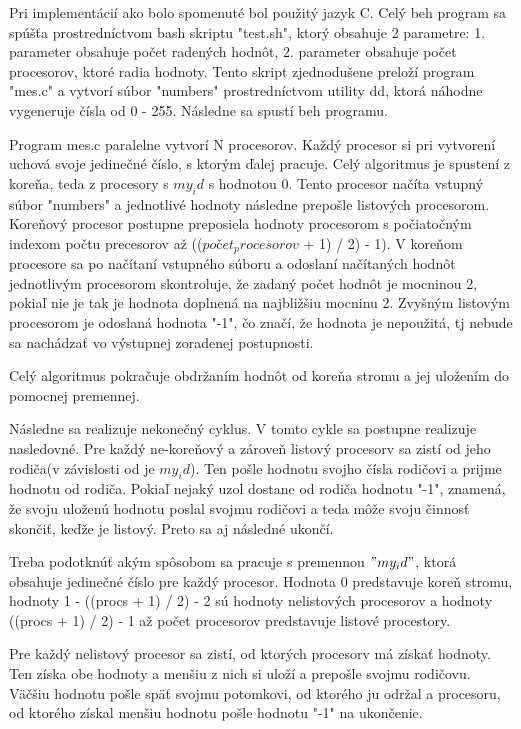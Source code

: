 \documentclass[12pt,a4paper,titlepage,final]{article}
\begin{document}
Pri implementácií ako bolo spomenuté bol použitý jazyk C. Celý beh program sa spúšťa prostredníctvom bash skriptu "test.sh", ktorý obsahuje 2 parametre: 1. parameter obsahuje počet radených hodnôt, 2. parameter obsahuje počet procesorov, ktoré radia hodnoty. Tento skript zjednodušene preloží program "mes.c" a vytvorí súbor "numbers" prostredníctvom utility dd, ktorá náhodne vygeneruje čísla od 0 - 255. Následne sa spustí beh programu.

Program mes.c paralelne vytvorí N procesorov. Každý procesor si pri vytvorení uchová svoje jedinečné číslo, s ktorým ďalej pracuje. Celý algoritmus je spustení z koreňa, teda z procesory s $my_id$ s hodnotou 0. Tento procesor načíta vstupný súbor "numbers" a jednotlivé hodnoty následne prepošle listových procesorom. Koreňový procesor postupne preposiela hodnoty procesorom s počiatočným indexom počtu precesorov až (($počet_procesorov$ + 1) / 2) - 1). V koreňom procesore sa po načítaní vstupného súboru a odoslaní načítaných hodnôt jednotlivým procesorom skontroluje, že zadaný počet hodnôt je mocninou 2, pokiaľ nie je tak je hodnota doplnená na najbližšiu mocninu 2. Zvyšným listovým procesorom je odoslaná hodnota "-1", čo značí, že hodnota je nepoužitá, tj nebude sa nachádzať vo výstupnej zoradenej postupnosti.

Celý algoritmus pokračuje obdržaním hodnôt od koreňa stromu a jej uložením do pomocnej premennej.

Následne sa realizuje nekonečný cyklus. V tomto cykle sa postupne realizuje nasledovné. Pre každý ne-koreňový a zároveň listový procesorv sa zistí od jeho rodiča(v závislosti od je $my_id$). Ten pošle hodnotu svojho čísla rodičovi a prijme hodnotu od rodiča. Pokiaľ nejaký uzol dostane od rodiča hodnotu "-1", znamená,  že svoju uloženú hodnotu poslal svojmu rodičovi a teda môže svoju činnosť skončiť, keďže je listový. Preto sa aj následné ukončí.

Treba podotknúť akým spôsobom sa pracuje s premennou $"my_id"$, ktorá obsahuje jedinečné číslo pre každý procesor. Hodnota 0 predstavuje koreň stromu, hodnoty 1 - ((procs + 1) / 2) - 2 sú hodnoty nelistových procesorov a hodnoty ((procs + 1) / 2) - 1 až počet procesorov predstavuje listové procestory.

Pre každý nelistový procesor sa zistí, od ktorých procesorv má získať hodnoty. Ten získa obe hodnoty a menšiu z nich si uloží a prepošle svojmu rodičovu. Väčšiu hodnotu pošle späť svojmu potomkovi, od ktorého ju održal a procesoru, od ktorého získal menšiu hodnotu pošle hodnotu "-1" na ukončenie. 
\end{document}
